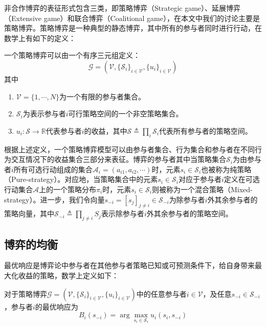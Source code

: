 非合作博弈的表征形式包含三类，即策略博弈（Strategic game）、延展博弈（Extensive game）和联合博弈（Coalitional game），在本文中我们的讨论主要是策略博弈。策略博弈是一种典型的静态博弈，其中所有的参与者同时进行行动，在数学上有如下的定义：
\begin{df}[策略博弈]
一个策略博弈可以由一个有序三元组定义：
\begin{equation}
\mathcal{G}=(\mathcal{V},\{\mathcal{S}_i\}_{i\in\mathcal{V}},\{u_i\}_{i\in\mathcal{V}})
\end{equation}
其中
\begin{enumerate}
\item $\mathcal{V}=\{1,\cdots,N\}$为一个有限的参与者集合。
\item $\mathcal{S}_i$为表示参与者$i$可行策略空间的一个非空策略集合。
\item $u_i: \mathcal{S}\rightarrow  \mathbb{R}$代表参与者$i$的收益，其中$\mathcal{S}\triangleq\prod_i\mathcal{S}_i$代表所有参与者的策略空间。
\end{enumerate}
\end{df}
根据上述定义，一个策略博弈模型可以由参与者集合、行为集合和参与者在不同行为交互情况下的收益集合三部分来表征。博弈的参与者其中当策略集合$\mathcal{S}_i$为由参与者$i$所有可选行动组成的集合$\mathcal{A}_i=(a_{i1},a_{i2},\cdots)$时，元素$s_i\in\mathcal{S}_i$也被称为纯策略（Pure-strategy）。对应地，当策略集合中的元素$s_i\in\mathcal{S}_i$对应于参与者$i$定义在可选行动集合$\mathcal{A}$上的一个策略分布$\pi_i$时，元素$s_i\in\mathcal{S}_i$则被称为一个混合策略（Mixed-strategy）。进一步，我们令向量$s_{-i}=[s_j]_{j\neq i}\in\mathcal{S}_{-i}$为除参与者$i$外其余参与者的策略向量，其中$\mathcal{S}_{-i}\triangleq\prod_{j\neq i}S_j$表示除参与者$i$外其余参与者的策略空间。


\subsection{博弈的均衡}

最优响应是博弈论中参与者在其他参与者策略已知或可预测条件下，给自身带来最大化收益的策略，数学上定义如下：
\begin{df}[最优响应]
对于策略博弈$\mathcal{G}=(\mathcal{V},\{\mathcal{S}_i\}_{i\in\mathcal{V}},\{u_i\}_{i\in\mathcal{V}})$中的任意参与者$i\in\mathcal{V}$，及任意$s_{-i}\in\mathcal{S}_{-i}$，参与者$i$的最优响应为
\begin{equation}
B_i(s_{-i})=\arg\max_{s_i\in\mathcal{S}_i}u_i(s_i,s_{-i})
\end{equation}
\end{df}

